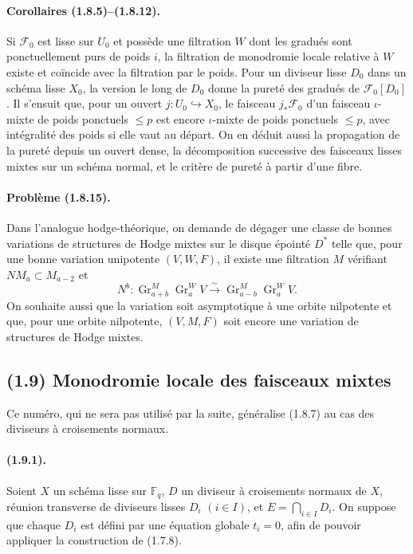 \documentclass[11pt]{article}
\theoremstyle{remark}
\newcommand{\Fq}{\mathbb{F}_q}
\newcommand{\Gr}{\operatorname{Gr}}
\begin{document}
\paragraph{Corollaires (1.8.5)--(1.8.12).}
Si $\mathcal F_0$ est lisse sur $U_0$ et possède une filtration $W$ dont les gradués sont ponctuellement purs de poids $i$, la filtration de monodromie locale relative à $W$ existe et coïncide avec la filtration par le poids. Pour un diviseur lisse $D_0$ dans un schéma lisse $X_0$, la version le long de $D_0$ donne la pureté des gradués de $\mathcal F_0[D_0]$. Il s'ensuit que, pour un ouvert $j:U_0\hookrightarrow X_0$, le faisceau $j_*\mathcal F_0$ d'un faisceau $\iota$-mixte de poids ponctuels $\le p$ est encore $\iota$-mixte de poids ponctuels $\le p$, avec intégralité des poids si elle vaut au départ. On en déduit aussi la propagation de la pureté depuis un ouvert dense, la décomposition successive des faisceaux lisses mixtes sur un schéma normal, et le critère de pureté à partir d'une fibre.

\paragraph{Problème (1.8.15).}
Dans l'analogue hodge-théorique, on demande de dégager une classe de bonnes variations de structures de Hodge mixtes sur le disque épointé $D^*$ telle que, pour une bonne variation unipotente $(V,W,F)$, il existe une filtration $M$ vérifiant $NM_a\subset M_{a-2}$ et
\[
N^b:\Gr^M_{a+b}\Gr^W_aV\xrightarrow{\sim}\Gr^M_{a-b}\Gr^W_aV.
\]
On souhaite aussi que la variation soit asymptotique à une orbite nilpotente et que, pour une orbite nilpotente, $(V,M,F)$ soit encore une variation de structures de Hodge mixtes.


\subsection*{(1.9) Monodromie locale des faisceaux mixtes}

Ce numéro, qui ne sera pas utilisé par la suite, généralise (1.8.7) au cas des diviseurs à croisements normaux.

\paragraph{(1.9.1).}
Soient \(X\) un schéma lisse sur \(\Fq\), \(D\) un diviseur à croisements normaux de \(X\), réunion transverse de diviseurs lisses \(D_i\) \((i\in I)\), et \(E=\bigcap_{i\in I}D_i\). On suppose que chaque \(D_i\) est défini par une équation globale \(t_i=0\), afin de pouvoir appliquer la construction de (1.7.8).
\end{document}
